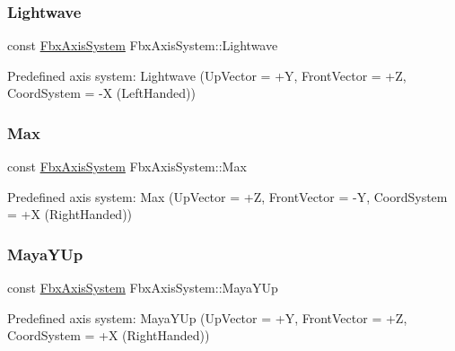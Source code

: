 \mbox{\label{class_fbx_axis_system_a45fc90ee125c8dafa7ca95f62e7485a8}} 
\subsubsection{\texorpdfstring{Lightwave}{Lightwave}}
{\footnotesize\ttfamily const \hyperlink{class_fbx_axis_system}{Fbx\+Axis\+System} Fbx\+Axis\+System\+::\+Lightwave\hspace{0.3cm}{\ttfamily [static]}}



Predefined axis system\+: Lightwave (Up\+Vector = +Y, Front\+Vector = +Z, Coord\+System = -\/X (Left\+Handed)) 

\mbox{\label{class_fbx_axis_system_a3ac2db6cd471f8477a1d0b4a3ad22608}} 
\subsubsection{\texorpdfstring{Max}{Max}}
{\footnotesize\ttfamily const \hyperlink{class_fbx_axis_system}{Fbx\+Axis\+System} Fbx\+Axis\+System\+::\+Max\hspace{0.3cm}{\ttfamily [static]}}



Predefined axis system\+: Max (Up\+Vector = +Z, Front\+Vector = -\/Y, Coord\+System = +X (Right\+Handed)) 

\mbox{\label{class_fbx_axis_system_a898f6952538dbc23cead05b2a1e19d10}} 
\subsubsection{\texorpdfstring{Maya\+Y\+Up}{MayaYUp}}
{\footnotesize\ttfamily const \hyperlink{class_fbx_axis_system}{Fbx\+Axis\+System} Fbx\+Axis\+System\+::\+Maya\+Y\+Up\hspace{0.3cm}{\ttfamily [static]}}



Predefined axis system\+: Maya\+Y\+Up (Up\+Vector = +Y, Front\+Vector = +Z, Coord\+System = +X (Right\+Handed)) 

